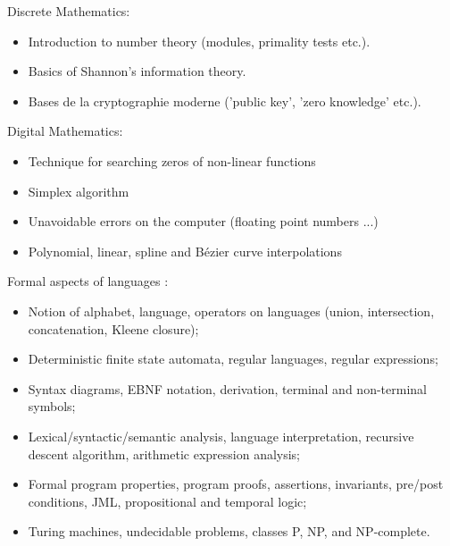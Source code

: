 Discrete Mathematics:
\begin{itemize}
    \item Introduction to number theory (modules, primality tests etc.).
    \item Basics of Shannon's information theory.
    \item Bases de la cryptographie moderne ('public key', 'zero knowledge' etc.).
\end{itemize}
Digital Mathematics:
\begin{itemize}
    \item Technique for searching zeros of non-linear functions
    \item Simplex algorithm
    \item Unavoidable errors on the computer (floating point numbers ...)
    \item Polynomial, linear, spline and Bézier curve interpolations
\end{itemize}
\pagebreak
Formal aspects of languages :
\begin{itemize}
    \item Notion of alphabet, language, operators on languages (union, intersection, concatenation, Kleene closure);
    \item Deterministic finite state automata, regular languages, regular expressions;
    \item Syntax diagrams, EBNF notation, derivation, terminal and non-terminal symbols;
    \item Lexical/syntactic/semantic analysis, language interpretation, recursive descent algorithm, arithmetic expression analysis;
    \item Formal program properties, program proofs, assertions, invariants, pre/post conditions, JML, propositional and temporal logic;
    \item Turing machines, undecidable problems, classes P, NP, and NP-complete.
\end{itemize}